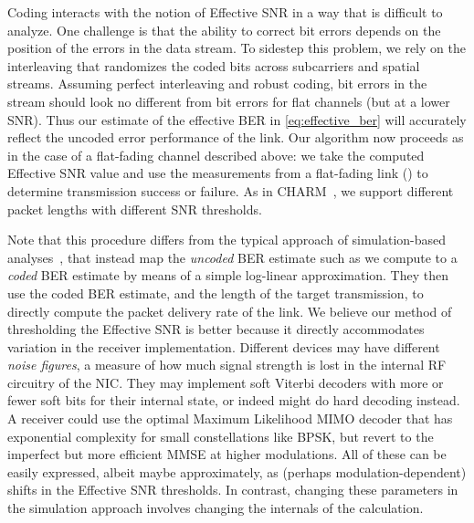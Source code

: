 Coding interacts with the notion of Effective SNR in a way that is difficult to analyze. One challenge is that the ability to correct bit errors depends on the position of the errors in the data stream. To sidestep this problem, we rely on the interleaving that randomizes the coded bits across subcarriers and spatial streams. Assuming perfect interleaving and robust coding, bit errors in the stream should look no different from bit errors for flat channels (but at a lower SNR). Thus our estimate of the effective BER in \eqref{eq:effective_ber} will accurately reflect the uncoded error performance of the link. Our algorithm now proceeds as in the case of a flat-fading channel described above: we take the computed Effective SNR value and use the measurements from a flat-fading link () to determine transmission success or failure. As in CHARM~\cite{judd_rate_adapt}, we support different packet lengths with different SNR thresholds.

Note that this procedure differs from the typical approach of simulation-based analyses~\cite{Kant_fla, Liu_EESM, Nortel_3g}, that instead map the \emph{uncoded} BER estimate such as we compute to a \emph{coded} BER estimate by means of a simple log-linear approximation. They then use the coded BER estimate, and the length of the target transmission, to directly compute the packet delivery rate of the link. We believe our method of thresholding the Effective SNR is better because it directly accommodates variation in the receiver implementation. Different devices may have different \emph{noise figures}, a measure of how much signal strength is lost in the internal RF circuitry of the NIC\@. They may implement soft Viterbi decoders with more or fewer soft bits for their internal state, or indeed might do hard decoding instead. A receiver could use the optimal Maximum Likelihood MIMO decoder that has exponential complexity for small constellations like BPSK, but revert to the imperfect but more efficient MMSE at higher modulations. All of these can be easily expressed, albeit maybe approximately, as (perhaps modulation-dependent) shifts in the Effective SNR thresholds. In contrast, changing these parameters in the simulation approach involves changing the internals of the calculation.

